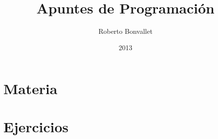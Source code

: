 \documentclass[dvipsnames,10pt]{memoir}
\title{Apuntes de Programaci\'on}
\author{
  Roberto Bonvallet %
}
\date{2013}
\begin{document}
  \frontmatter
  
  \newpage
  

  \mainmatter
  \part{Materia}
  
  \part{Ejercicios}
  
  
  
%  
\end{document}
